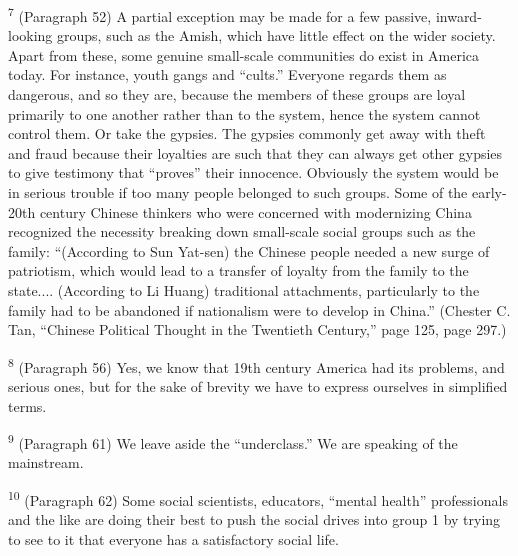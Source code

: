 \documentclass{article}
\begin{document}
\textsuperscript{7} (Paragraph 52) A partial exception may be made for a few passive, inward-looking groups, such 
as the Amish, which have little effect on the wider society.  Apart from these, some genuine 
small-scale communities do exist in America today.  For instance, youth gangs and “cults.” 
Everyone regards them as dangerous, and so they are, because the members of these groups are 
loyal primarily to one another rather than to the system, hence the system cannot control 
them.  Or take the gypsies.  The gypsies commonly get away with theft and fraud because their 
loyalties are such that they can always get other gypsies to give testimony that “proves” their 
innocence.  Obviously the system would be in serious trouble if too many people belonged to 
such groups.  Some of the early-20th century Chinese thinkers who were concerned with 
modernizing China recognized the necessity breaking down small-scale social groups such as the 
family: “(According to Sun Yat-sen) the Chinese people needed a new surge of patriotism, which 
would lead to a transfer of loyalty from the family to the state....  (According to Li Huang) 
traditional attachments, particularly to the family had to be abandoned if nationalism were to 
develop in China.” (Chester C.  Tan, “Chinese Political Thought in the Twentieth Century,” page 
125, page 297.) \vspace{\baselineskip}

\textsuperscript{8} (Paragraph 56) Yes, we know that 19th century America had its problems, and serious ones, but 
for the sake of brevity we have to express ourselves in simplified terms. \vspace{\baselineskip} \newpage

\textsuperscript{9} (Paragraph 61) We leave aside the “underclass.” We are speaking of the mainstream. \vspace{\baselineskip}

\textsuperscript{10} (Paragraph 62) Some social scientists, educators, “mental health” professionals and the like are 
doing their best to push the social drives into group 1 by trying to see to it that everyone has a 
satisfactory social life. \vspace{\baselineskip}
\end{document}
